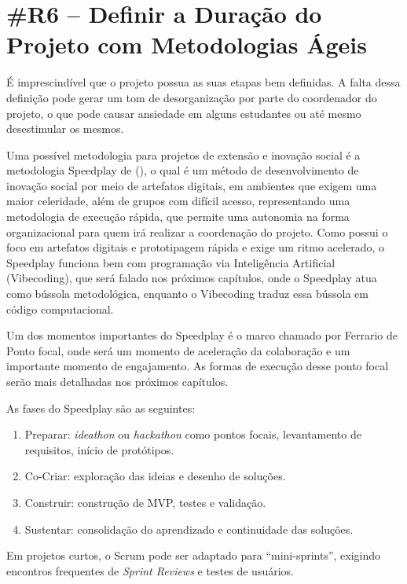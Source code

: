 \section*{\#R6 – Definir a Duração do Projeto com Metodologias Ágeis}

É imprescindível que o projeto possua as suas etapas bem definidas. A falta dessa definição pode gerar um tom de desorganização por parte do coordenador do projeto, o que pode causar ansiedade em alguns estudantes ou até mesmo desestimular os mesmos. 

Uma possível metodologia para projetos de extensão e inovação social é a metodologia Speedplay de \citeauthor{ferrario2014} (\citeyear{ferrario2014}), o qual é um método de desenvolvimento de inovação social por meio de artefatos digitais, em ambientes que exigem uma maior celeridade, além de grupos com difícil acesso, representando uma metodologia de execução rápida, que permite uma autonomia na forma organizacional para quem irá realizar a coordenação do projeto. Como possui o foco em artefatos digitais e prototipagem rápida e exige um ritmo acelerado, o Speedplay funciona bem com programação via Inteligência Artificial (Vibecoding), que será falado nos próximos capítulos, onde o Speedplay atua como bússola metodológica, enquanto o Vibecoding traduz essa bússola em código computacional. 

Um dos momentos importantes do Speedplay é o marco chamado por Ferrario de Ponto focal, onde será um momento de aceleração da colaboração e um importante momento de engajamento. As formas de execução desse ponto focal serão mais detalhadas nos próximos capítulos.

As fases do Speedplay são as seguintes:

\begin{enumerate}
    \item Preparar: \textit{ideathon} ou \textit{hackathon} como pontos focais, levantamento de requisitos, início de protótipos.
    \item Co-Criar: exploração das ideias e desenho de soluções.
    \item Construir: construção de MVP, testes e validação.
    \item Sustentar: consolidação do aprendizado e continuidade das soluções.
\end{enumerate}

Em projetos curtos, o Scrum pode ser adaptado para “mini-sprints”, exigindo encontros frequentes de \textit{Sprint Reviews} e testes de usuários.
